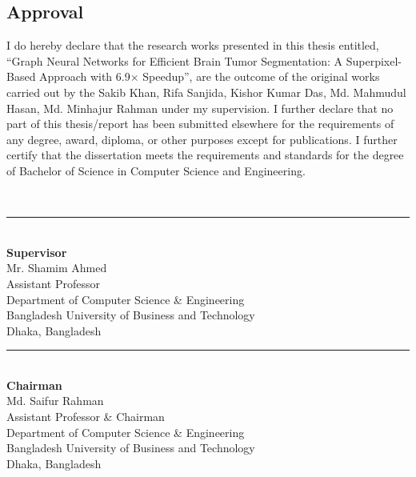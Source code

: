 \begin{center}
    \section*{Approval}
\end{center}


I do hereby declare that the research works presented in this thesis entitled, “Graph Neural Networks for Efficient Brain Tumor Segmentation:
     A Superpixel-Based Approach with 6.9× Speedup”, are the outcome of the original works carried out by the Sakib Khan, Rifa Sanjida, Kishor Kumar Das, Md. Mahmudul Hasan, Md. Minhajur Rahman under my supervision. I further declare that no part of this thesis/report has been submitted elsewhere for the requirements of any degree, award, diploma, or other purposes except for publications. I further certify that the dissertation meets the requirements and standards for the degree of Bachelor of Science in Computer Science and Engineering.

\vspace{6mm}

\null\hfill\\
\noindent\rule{9.3cm}{0.2pt} \\ 
\textbf{Supervisor}\\
Mr. Shamim Ahmed \\
Assistant Professor \\
Department of Computer Science \& Engineering \\
Bangladesh University of Business and Technology\\
Dhaka, Bangladesh


\vspace{16mm}

\begin{flushleft}
\nopagebreak
\noindent\rule{9.3cm}{0.2pt} \\ 
\nopagebreak
\textbf{Chairman} \null\hfill  \\
\nopagebreak
Md. Saifur Rahman \\
\nopagebreak
Assistant Professor \& Chairman \\
\nopagebreak
Department of Computer Science \& Engineering \\
\nopagebreak
Bangladesh University of Business and Technology\\
\nopagebreak
Dhaka, Bangladesh\\
\end{flushleft}